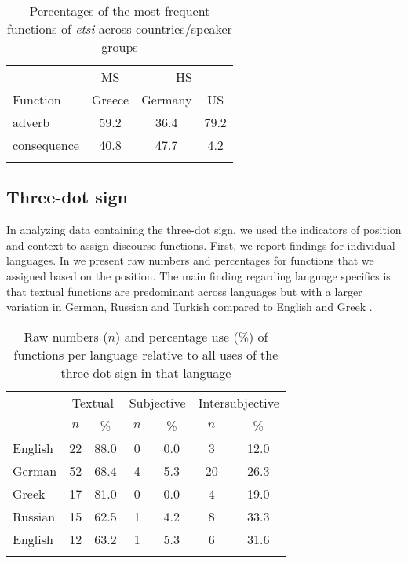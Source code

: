 \documentclass[output=paper,colorlinks,citecolor=brown]{langscibook}
\begin{document}
\begin{table}
\caption{Percentages of the most frequent functions of \textit{etsi} across countries\slash speaker groups}
\label{tab:labrenzetal:8}
 \centering
 \begin{tabularx}{.6\textwidth}{X  c  c  c }
  \lsptoprule
            & MS & \multicolumn{2}{c}{HS}  \\
  \cmidrule(r){2-2} \cmidrule(l){3-4}
  Function  &   Greece  &    Germany  &    US  \\
  \midrule
  adverb       &   59.2 &   36.4  &    79.2  \\
  consequence  &   40.8 &   47.7  &   4.2 \\
  \lspbottomrule
 \end{tabularx}
\end{table}

\subsection{Three-dot sign}
\label{sec:sub:labrenzetal:Three_dot_sign}
\largerpage
In analyzing data containing the three-dot sign, we used the indicators of position and context to assign discourse functions. First, we report findings for individual languages. In  we present raw numbers and percentages for functions that we assigned based on the position. The main finding regarding language specifics is that textual functions are predominant across languages but with a larger variation in German, Russian and Turkish compared to English and Greek \citep[cf.][260--61]{labrenz_three-dot_2022}.

\begin{table}
\caption{Raw numbers ($n$) and percentage use (\%) of functions per language relative to all uses of the three-dot sign in that language}
\label{tab:labrenzetal:9}
 \centering
 \begin{tabular}{l  c  c  c  c  c  c}
  \lsptoprule
            & \multicolumn{2}{c}{Textual} & \multicolumn{2}{c}{Subjective} & \multicolumn{2}{c}{Intersubjective}  \\
  \cmidrule(lr){2-3} \cmidrule(lr){4-5}\cmidrule(lr){6-7}
            &  $n$  &  \%  &  $n$  &  \%  &  $n$ &  \%   \\
  \midrule
  English  &  22 &  88.0  &  0  &  0.0  &  3  &  12.0 \\
  German  &  52 &  68.4  &  4  &  5.3  &  20 &  26.3 \\
  Greek  &  17 &  81.0  &  0  &  0.0  &  4  &  19.0 \\
  Russian  &  15 &  62.5  &  1  &  4.2  &  8  &  33.3 \\
  English  &  12 &  63.2  &  1  &  5.3  &  6  &  31.6 \\
  \lspbottomrule
 \end{tabular}
\end{table}
\end{document}
